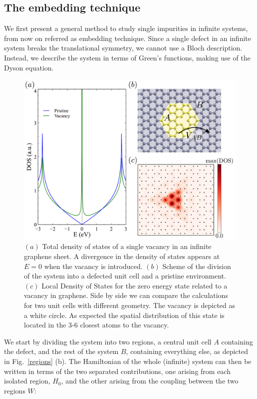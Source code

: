 \subsection{The embedding technique}
We first present a general method to study single impurities in infinite systems, from now on referred as embedding technique\cite{Jacob2010}.
Since a single defect in an infinite system breaks the translational symmetry, we cannot use a Bloch description. Instead, we describe the system in terms of Green's functions, making use of the Dyson equation.
\begin{figure}[t!]
\centering\includegraphics{defects/fig/DOSlDOS.pdf}
\caption{$(a)$ Total density of states of a single vacancy in an infinite graphene sheet. A divergence in the density of states appears at $E=0$ when the vacancy is introduced. $(b)$ Scheme of the division of the system into a defected unit cell and a pristine environment. $(c)$ Local Density of States for the zero energy state related to a vacancy in graphene. Side by side we can compare the calculations for two unit cells with different geometry. The vacancy is depicted as a white circle. As expected the spatial distribution of this state is located in the 3-6 closest atoms to the vacancy.}
\label{regions}
\label{DOS}
\vspace{-5pt}
\end{figure}

\medskip
We start by dividing the system into two regions, a central unit cell $A$ containing the defect, and the rest of the system $B$, containing everything else, as depicted in Fig.~\ref{regions} (b).
The Hamiltonian of the whole (infinite) system can then be written in terms of the two separated contributions, one arising from each isolated region, $H_0$, and the other arising from the coupling between the two regions $W$:

